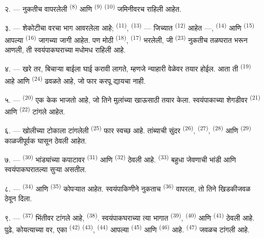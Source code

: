 २. --- नुकतीच वापरलेली  \textsuperscript{(8)} आणि 
\textsuperscript{(9)}  \textsuperscript{(10)} जमिनीवरच राहिली आहेत.

३. --- शेकोटीचा वरचा भाग आवरलेला आहे;  \textsuperscript{(11)}, 
\textsuperscript{(13)} — जिच्यात  \textsuperscript{(12)} आहेत —,
 \textsuperscript{(14)} आणि  \textsuperscript{(15)} आपल्या
 \textsuperscript{(16)} जागच्या जागी आहेत. पण मोठी 
\textsuperscript{(18)},  \textsuperscript{(17)} भरलेली, जी
 \textsuperscript{(23)} नुकतीच तळघरात भरून आणली, ती स्वयंपाकघराच्या
मधोमध राहिली आहे.

४. --- खरे तर, बिचाऱ्या बाईला घाई करावी लागते, म्हणजे न्याहारी वेळेवर तयार होईल. आता ती
 \textsuperscript{(19)} आहे आणि 
\textsuperscript{(24)} ढवळते आहे, जो फार करपू द्यायचा नाही.

५. ---  \textsuperscript{(20)} एक केक भाजतो आहे, जो तिने मुलांच्या खाऊसाठी तयार
केला. स्वयंपाकाच्या शेगडीवर  \textsuperscript{(21)} आणि 
\textsuperscript{(22)} टांगले आहेत.

\VUsaut{4.0mm}
\VUsaut{3.0mm}

६. --- खोलीच्या टोकाला टांगलेली  \textsuperscript{(25)} फार स्वच्छ आहे.
तांब्याची सुंदर  \textsuperscript{(26)}, 
\textsuperscript{(27)},  \textsuperscript{(28)} आणि 
\textsuperscript{(29)} काळजीपूर्वक घासून ठेवली आहेत.

७. ---  \textsuperscript{(30)} भांड्यांच्या कपाटावर
 \textsuperscript{(31)} आणि 
\textsuperscript{(32)} ठेवली आहे.  \textsuperscript{(33)} बहुधा जेवणाची भांडी आणि
स्वयंपाकघरातल्या सुऱ्या असतील.

८. ---  \textsuperscript{(34)} आणि  \textsuperscript{(35)}
कोपऱ्यात आहेत. स्वयंपाकिणीने नुकताच  \textsuperscript{(36)} वापरला, तो
तिने खिडकीजवळ ठेवून दिला.

९. ---  \textsuperscript{(37)} भिंतीवर टांगले आहे,
 \textsuperscript{(38)}. स्वयंपाकघराच्या त्या भागात 
\textsuperscript{(39)},  \textsuperscript{(40)} आणि 
\textsuperscript{(41)} ठेवली आहे. पुढे, कोयत्याच्या वर, एका 
\textsuperscript{(42)}  \textsuperscript{(43)}, 
\textsuperscript{(44)} आपल्या  \textsuperscript{(45)} आणि 
\textsuperscript{(46)} आहे.  \textsuperscript{(47)} जवळच टांगली आहे.

